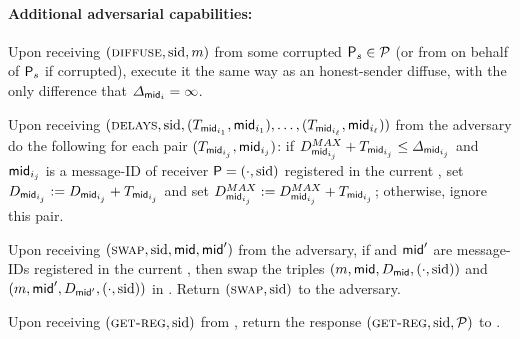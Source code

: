 \begin{cccFunctionality}
      \paragraph{Additional adversarial capabilities:}
      \begin{cccItemize}[nosep]
            \item Upon receiving $(\textsc{diffuse}, \mathrm{sid}, m)$ from some corrupted $\mathsf{P}_s \in \mathcal{P}$ (or from \adv on behalf of $\mathsf{P}_s$ if corrupted), 
            execute it the same way as an honest-sender diffuse, with the only difference that $\varDelta_{\mathsf{mid}_i} = \infty$.

            \item Upon receiving $(\textsc{delays}, \mathrm{sid}, (T_{\mathsf{mid}_{i_1}}, \mathsf{mid}_{i_1}), \ldots, (T_{\mathsf{mid}_{i_\ell}}, \mathsf{mid}_{i_\ell}))$ from the adversary do the following for each pair $(T_{\mathsf{mid}_{i_j}}, \mathsf{mid}_{i_j})$:
            if $D^{MAX}_{\mathsf{mid}_{i_j}} + T_{\mathsf{mid}_{i_j}} \le \varDelta_{\mathsf{mid}_{i_j}}$ and $\mathsf{mid}_{i_j}$ is a message-ID of receiver $\mathsf{P} = (\cdot, \mathrm{sid})$ registered in the current \vecM, set $D_{\mathsf{mid}_{i_j}} := D_{\mathsf{mid}_{i_j}} + T_{\mathsf{mid}_{i_j}}$ and set $D^{MAX}_{\mathsf{mid}_{i_j}} := D^{MAX}_{\mathsf{mid}_{i_j}} + T_{\mathsf{mid}_{i_j}}$; otherwise, ignore this pair.

            \item Upon receiving $(\textsc{swap}, \mathrm{sid}, \mathsf{mid}, \mathsf{mid}')$ from the adversary, if \msgid and $\mathsf{mid}'$ are message-IDs registered in the current \vecM, then swap the triples $(m, \mathsf{mid}, D_\mathsf{mid}, (\cdot, \mathrm{sid}))$ and $(m, \mathsf{mid}', D_{\mathsf{mid}'}, (\cdot, \mathrm{sid}))$ in \vecM.
            Return $(\textsc{swap}, \mathrm{sid})$ to the adversary.

            \item Upon receiving $(\textsc{get-reg}, \mathrm{sid})$ from \adv, return the response $(\textsc{get-reg}, \mathrm{sid}, \mathcal{P})$ to \adv.
      \end{cccItemize}
\end{cccFunctionality}